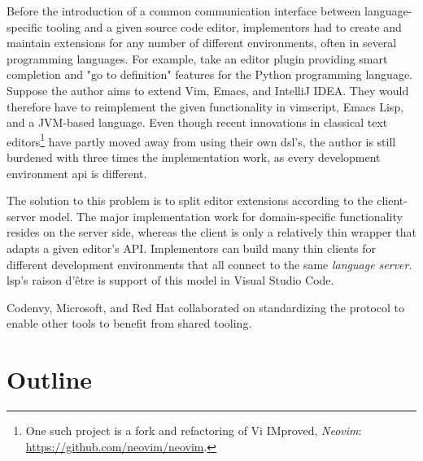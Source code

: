 Before the introduction of a common communication interface between
language-specific tooling and a given source code editor, implementors had to
create and maintain extensions for any number of different environments, often
in several programming languages. For example, take an editor plugin providing
smart completion and "go to definition" features for the Python programming
language. Suppose the author aims to extend Vim, Emacs, and IntelliJ IDEA. They
would therefore have to reimplement the given functionality in vimscript, Emacs
Lisp, and a JVM-based language. Even though recent innovations in classical text
editors\footnote{One such project is a fork and refactoring of Vi IMproved,
\emph{Neovim}: \url{https://github.com/neovim/neovim}.} have partly moved away
from using their own \acrshort{dsl}'s, the author is still burdened with three
times the implementation work, as every development environment \acrshort{api}
is different.

The solution to this problem is to split editor extensions according to the
client-server model. The major implementation work for domain-specific
functionality resides on the server side, whereas the client is only a
relatively thin wrapper that adapts a given editor's API. Implementors can build
many thin clients for different development environments that all connect to the
same \emph{language server}. \acrshort{lsp}'s raison d'être is support of this
model in Visual Studio Code.

Coden\-vy, Microsoft, and Red Hat collaborated on standardizing the protocol to
enable other tools to benefit from shared
tooling\cite{sdtimesCodenvyMicrosoft,infoworldMicrosoftbackedLanguage}.

\section{Outline}

